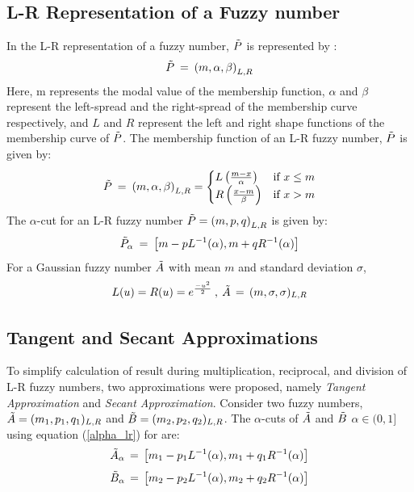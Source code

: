 \documentclass{article}
\begin{document}
\subsection{L-R Representation of a Fuzzy number}
In the L-R representation of a fuzzy number, $\Tilde{P}$ is represented by :
\[ \Tilde{P} \:=\: \left( m, \alpha, \beta\right)_{L,R} \] \newline Here, m represents the modal value of the membership function, $\alpha$ and $\beta$ represent the left-spread and the right-spread of the membership curve respectively, and $L$ and $R$ represent the left and right shape functions of the membership curve of $\Tilde{P}$. The membership function of an L-R fuzzy number, $\Tilde{P}$ is given by:
\begin{equation}
    \Tilde{P} \:=\: \left( m, \alpha, \beta\right)_{L,R} = \begin{cases}
        L\left(\frac{m-x}{\alpha} \right) & \text{if } x \leq m\\
        R\left(\frac{x-m}{\beta} \right) & \text{if } x > m
    \end{cases}
\end{equation} \newline The $\alpha$-cut for an L-R fuzzy number $\Tilde{P} = \left( m, p, q\right)_{L,R}$ is given by:
\begin{equation} \label{alpha_lr}
     \Tilde{P}_\alpha \:=\: \left[ m - p L^{-1}(\alpha),  m + q R^{-1}(\alpha) \right]
\end{equation} \newline For a Gaussian fuzzy number $\Tilde{A}$ with mean $m$ and standard deviation $\sigma$, 
\begin{equation}
   L(u) = R(u) = e^{\frac{-u^2}{2}}\:, \: \Tilde{A}\,=\,(m, \sigma, \sigma)_{L,R} 
\end{equation}

\subsection{Tangent and Secant Approximations}
To simplify calculation of result during multiplication, reciprocal, and division of L-R fuzzy numbers, two approximations were proposed, namely \textit{Tangent Approximation} and \textit{Secant Approximation}. Consider two fuzzy numbers, $\Tilde{A} = (m_1, p_1, q_1)_{L,R}$ and $\Tilde{B} = (m_2, p_2, q_2)_{L,R}$. The $\alpha$-cuts of $\Tilde{A}$ and $\Tilde{B}$  $\alpha\in(0,1]$ using equation (\ref{alpha_lr}) for are:
\[ \Tilde{A}_\alpha \,=\, \left[ m_1 - p_1 L^{-1}(\alpha),  m_1 + q_1 R^{-1}(\alpha) \right] \]
\[ \Tilde{B}_\alpha \,=\, \left[ m_2 - p_2 L^{-1}(\alpha),  m_2 + q_2 R^{-1}(\alpha) \right] \]
\end{document}
